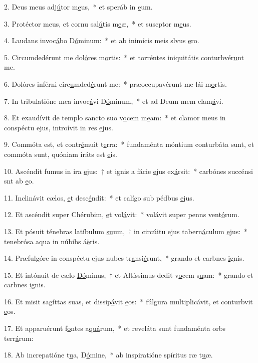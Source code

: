 2. Deus meus adj\uline{ú}tor m\uline{e}us,~* et speráb in \uline{e}um.\par 
3. Protéctor meus, et cornu sal\uline{ú}tis m\uline{e}æ,~* et suscptor m\uline{e}us.\par 
4. Laudans invoc\uline{á}bo D\uline{ó}minum:~* et ab inimícis meis slvus \uline{e}ro.\par 
5. Circumdedérunt me dol\uline{ó}res m\uline{o}rtis:~* et torréntes iniquitátis conturbvér\uline{u}nt me.\par 
6. Dolóres inférni circ\uline{u}mded\uline{é}runt me:~* præoccupavérunt me lái m\uline{o}rtis.\par 
7. In tribulatióne mea invoc\uline{á}vi D\uline{ó}minum,~* et ad Deum mem clam\uline{á}vi.\par 
8. Et exaudívit de templo sancto suo v\uline{o}cem m\uline{e}am:~* et clamor meus in conspéctu ejus, introívit in res \uline{e}jus.\par 
9. Commóta est, et contr\uline{é}muit t\uline{e}rra:~* fundaménta móntium conturbáta sunt, et commóta sunt, quóniam iráts est \uline{e}is.\par 
10. Ascéndit fumus in ira \uline{e}jus:~† et ignis a fácie \uline{e}jus ex\uline{á}rsit:~* carbónes succénsi snt ab \uline{e}o.\par 
11. Inclinávit cælos, \uline{e}t desc\uline{é}ndit:~* et calígo sub pédbus \uline{e}jus.\par 
12. Et ascéndit super Chérubim, \uline{e}t vol\uline{á}vit:~* volávit super penns vent\uline{ó}rum.\par 
13. Et pósuit ténebras latíbulum \uline{su}um,~† in circúitu ejus tabern\uline{á}culum \uline{e}jus:~* tenebrósa aqua in núbibs á\uline{ë}ris.\par 
14. Præfulgóre in conspéctu ejus nubes tr\uline{a}nsi\uline{é}runt,~* grando et carbnes \uline{i}gnis.\par 
15. Et intónuit de cælo \uline{Dó}minus,~† et Altíssimus dedit v\uline{o}cem s\uline{u}am:~* grando et carbnes \uline{i}gnis.\par 
16. Et misit sagíttas suas, et dissip\uline{á}vit \uline{e}os:~* fúlgura multiplicávit, et conturbvit \uline{e}os.\par 
17. Et apparuérunt f\uline{o}ntes a\uline{quá}rum,~* et reveláta sunt fundaménta orbs terr\uline{á}rum:\par 
18. Ab increpatióne t\uline{u}a, D\uline{ó}mine,~* ab inspiratióne spíritus ræ t\uline{u}æ.\par 
